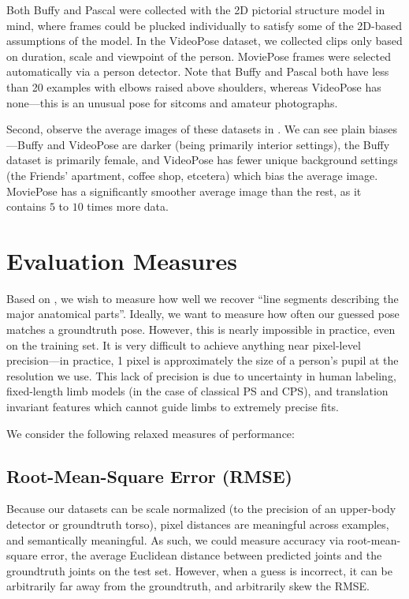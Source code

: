 Both Buffy and Pascal were collected with the 2D pictorial structure model in 
mind, where frames could be plucked individually to satisfy some of the 
2D-based assumptions of the model.  In the VideoPose dataset, we collected 
clips only based on duration, scale and viewpoint of the person.  MoviePose 
frames were selected automatically via a person detector.  Note that Buffy and 
Pascal both have less than 20 examples with elbows raised above shoulders, 
whereas VideoPose has none---this is an unusual pose for sitcoms and amateur 
photographs.

Second, observe the average images of these datasets in 
.  We can see plain biases---Buffy and 
VideoPose are darker (being primarily interior settings), the Buffy dataset is 
primarily female, and VideoPose has fewer unique background settings (the 
Friends' apartment, coffee shop, etcetera) which bias the average image.  
MoviePose has a significantly smoother average image than the rest, as it 
contains $5$ to $10$ times more data.


\section{Evaluation Measures}

Based on , we wish to measure how well we recover ``line segments 
describing the major anatomical parts''.  Ideally, we want to measure how often 
our guessed pose matches a groundtruth pose.  However, this is nearly 
impossible in practice, even on the training set. It is very difficult to 
achieve anything near pixel-level precision---in practice, 1 pixel is 
approximately the size of a person's pupil at the resolution we use.  This lack 
of precision is due to uncertainty in human labeling, fixed-length limb models 
(in the case of classical PS and CPS), and translation invariant features which 
cannot guide limbs to extremely precise fits.

We consider the following relaxed measures of performance:

\subsection{Root-Mean-Square Error (RMSE)}  Because our datasets can be scale 
normalized (to the precision of an upper-body detector or groundtruth torso), 
pixel distances are meaningful across examples, and semantically meaningful.  
As such, we could measure accuracy via root-mean-square error, \ie the average 
Euclidean distance between predicted joints and the groundtruth joints on the 
test set.  However, when a guess is incorrect, it can be arbitrarily far away 
from the groundtruth, and arbitrarily skew the RMSE.  


